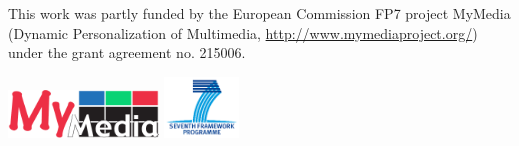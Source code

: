 \documentclass[a4paper, foldmark, 12pt]{leaflet}
\begin{document}
\vspace{0.4cm}

This work was partly funded by the European Commission FP7 project MyMedia
(Dynamic Personalization of Multimedia, \url{http://www.mymediaproject.org/})
under the grant agreement no. 215006.

\vspace{0.2cm}

\begin{center}
	\includegraphics[width=4.0cm]{fig/MyMediaLogoMedium.png}
	\hspace{1.5cm}
	\includegraphics[width=2.0cm]{fig/logo-fp7.png}\\
\end{center}
\end{document}
